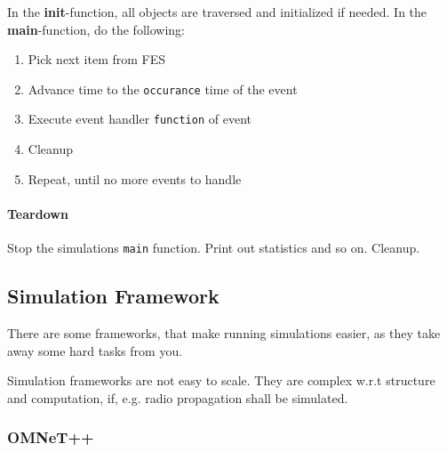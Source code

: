 \documentclass[english]{panikzettel}
\begin{document}
	In the  \textbf{init}-function, all objects are traversed and initialized if needed.
	In the \textbf{main}-function, do the following:
	\begin{enumerate}
		\item Pick next item from FES
		\item Advance time to the \texttt{occurance} time of the event
		\item Execute event handler  \texttt{function} of event
		\item Cleanup
		\item Repeat, until no more events to handle
	\end{enumerate}

	\paragraph{Teardown}
	\label{pgf:framework:teardown}

	Stop the simulations \texttt{main} function.
	Print out statistics and so on.
	Cleanup.
	
	\subsection{Simulation Framework}
	\label{ss:discrete-event-simulation:simulation-framework} 

	There are some frameworks, that make running simulations easier, as they take away some hard tasks from you.
	
	Simulation frameworks are not easy to scale. 
	They are complex w.r.t structure and computation, if, e.g. radio propagation shall be simulated.

	\subsubsection{OMNeT++}
	\label{sss:simulation-framework:omnet++}
	
\end{document}
